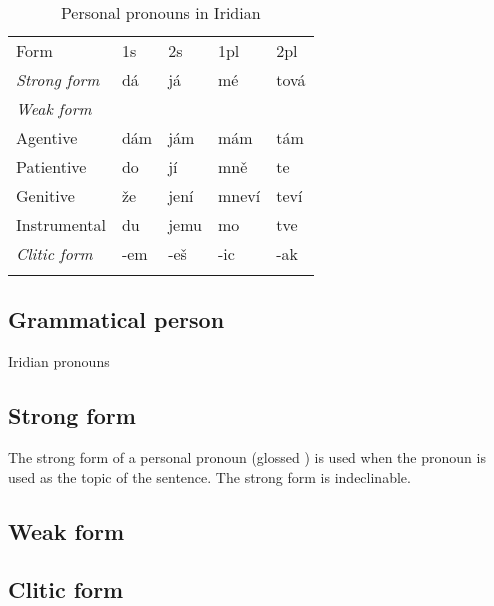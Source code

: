 \begin{table}[h!]
    \small
	\caption{Personal pronouns in Iridian}
	\medskip
	\begin{tabu} to 0.9 \textwidth {Y[3]YYYY}
		\toprule \addlinespace
        {\sc Form} & {\sc 1s} & {\sc 2s} & {\sc 1pl} & {\sc 2pl}\\\addlinespace
		\midrule\addlinespace
        \emph{Strong form}  & dá      & já      & mé      & tová \\\addlinespace
        \emph{Weak form}    &           &           &           & \\\addlinespace
        \quad Agentive      & dám     & jám     & mám     & tám\\\addlinespace
        \quad Patientive    & do        & jí      & mně      & te\\\addlinespace
        \quad Genitive      & že    & jení    & mneví   & teví\\\addlinespace
        \quad Instrumental  & du        & jemu      & mo        & tve\\\addlinespace
        \emph{Clitic form}  & -em       & -eš   & -ic       & -ak\\\addlinespace
        \bottomrule
	\end{tabu}

\end{table}

\subsection{Grammatical person}
Iridian pronouns

\subsection{Strong form}

The strong form of a personal pronoun (glossed ) is used when the pronoun is used as the topic of the sentence. The strong form is indeclinable.

\subsection{Weak form}

\subsection{Clitic form}

